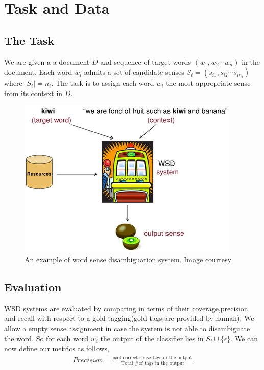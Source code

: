\documentclass[12pt,letterpaper]{article}
\newcommand{\blue}[1]{\textcolor{RoyalBlue}{#1}}
\newcommand{\instructions}[1]{\blue{\textit{#1}}}
\begin{document}
\section{Task and Data}
\label{sec:taskAndData}

\subsection{The Task}
\label{sec:task}
We are given a a document $D$ and sequence of target words $(w_1,w_2 \cdots w_n)$ in the document. Each word $w_i$ admits a set of candidate senses $S_i=(s_{i1},s_{i2} \cdots s_{in_i})$ where $|S_i|= n_i$. The task is to assign each word $w_i$ the most appropriate sense from its context in $D$. 
\begin{figure}[H]
\centering
\includegraphics[scale=0.8]{wsd.png}
\caption{An example of word sense disambiguation system. Image courtesy ~\protect\cite{navilgiblog}}
\end{figure}

\subsection{Evaluation}
WSD systems are evaluated by comparing in terms of their coverage,precision and recall with respect to a gold tagging(gold tags are provided by human). We allow a empty sense assignment in case the system is not able to disambiguate the word. So for each word $w_i$ the output of the classifier lies in $S_i \cup \{\epsilon\}$. We can now define  our metrics as follows,
\begin{align*}
Precision = \frac{\text{\# of correct sense tags in the output}}{\text{Total \# of tags in the output}}\\
\end{align*}
\end{document}
